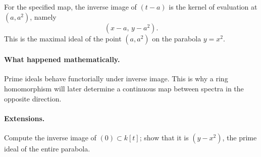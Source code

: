 For the specified map, the inverse image of \((t-a)\) is the kernel of evaluation at
\((a,a^2)\), namely
\[
(x-a,\,y-a^2).
\]
This is the maximal ideal of the point \((a,a^2)\) on the parabola \(y=x^2\).

\paragraph{What happened mathematically.}
Prime ideals behave functorially under inverse image.  This is why a ring homomorphism will
later determine a continuous map between spectra in the opposite direction.

\paragraph{Extensions.}
Compute the inverse image of \((0)\subset k[t]\); show that it is \((y-x^2)\), the prime
ideal of the entire parabola.
\fi
